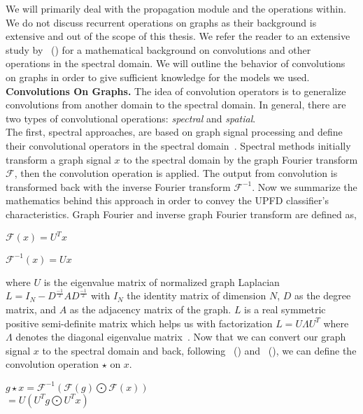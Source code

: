 We will primarily deal with the propagation module and the operations within. We do not discuss recurrent operations on graphs as their background is extensive and out of the scope of this thesis. We refer the reader to an extensive study by~\citeauthor{GNNsAReview_Zhou} (\citeyear{GNNsAReview_Zhou}) for a mathematical background on convolutions and other operations in the spectral domain. We will outline the behavior of convolutions on graphs in order to give sufficient knowledge for the models we used.\\
\textbf{Convolutions On Graphs.} The idea of convolution operators is to generalize convolutions from another domain to the spectral domain. In general, there are two types of convolutional operations: \emph{spectral} and \emph{spatial}.\\
The first, spectral approaches, are based on graph signal processing and define their convolutional operators in the spectral domain~\parencite{TheEmergingFieldOfSignalProcessingOnGraphs_Shuman}. Spectral methods initially transform a graph signal $x$ to the spectral domain by the graph Fourier transform $\mathcal{F}$, then the convolution operation is applied. The output from convolution is transformed back with the inverse Fourier transform $\mathcal{F}^{-1}$. Now we summarize the mathematics behind this approach in order to convey the UPFD classifier's characteristics. Graph Fourier and inverse graph Fourier transform are defined as,
\begin{center}
    $\mathcal{F}(x) = U^T x$
\end{center}
\begin{center}
    $\mathcal{F}^{-1}(x) = Ux$
\end{center}
where $U$ is the eigenvalue matrix of normalized graph Laplacian $L = I_N - D^{\frac{-1}{2}} A D^{\frac{-1}{2}}$ with $I_N$ the identity matrix of dimension $N$, $D$ as the degree matrix, and $A$ as the adjacency matrix of the graph. $L$ is a real symmetric positive semi-definite matrix which helps us with factorization $L = U \Lambda U^T$ where $\Lambda$ denotes the diagonal eigenvalue matrix~\parencite{GNNsAReview_Zhou}. Now that we can convert our graph signal $x$ to the spectral domain and back, following~\citeauthor{AWaveletTourOfSignalProcessing_Mallat} (\citeyear{AWaveletTourOfSignalProcessing_Mallat}) and~\citeauthor{GNNsAReview_Zhou} (\citeyear{GNNsAReview_Zhou}), we can define the convolution operation $\star$ on $x$.
\begin{center}
    $g \star x = \mathcal{F}^{-1}(\mathcal{F}(g) \bigodot \mathcal{F}(x))$ \\ $= U(U^T g \bigodot U^T x)$
\end{center}

